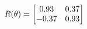 \documentclass[preview]{standalone}
\begin{document}
\begin{align*}
\special{dvisvgm:raw <g id='unique000'>}R(\theta) = \begin{bmatrix}0.93 & 0.37\\-0.37 & 0.93\end{bmatrix}\special{dvisvgm:raw </g>}
\end{align*}
\end{document}
